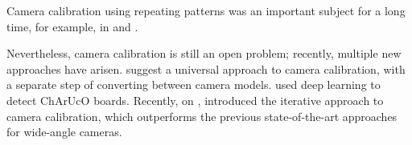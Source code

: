 Camera calibration using repeating patterns was an important subject for a long
time, for example, \textcite{schaffalitzkyGeometricGroupingRepeated1998} in
\citeyear{schaffalitzkyGeometricGroupingRepeated1998} and
\textcite{zhangFlexibleNewTechnique2000}.


Nevertheless, camera calibration is still an open problem; recently,
multiple new approaches have arisen. 
\textcite{lochmanBabelCalibUniversalApproach2021} suggest a universal approach
to camera calibration, with a separate step of converting between camera models.
\textcite{huDeepChArUcoDark2019} used deep learning to detect ChArUcO boards.
Recently, on ,
\textcite{duisterhofTartanCalibIterativeWideAngle2022} introduced the iterative
approach to camera calibration, which outperforms the previous state-of-the-art
approaches for wide-angle cameras.

